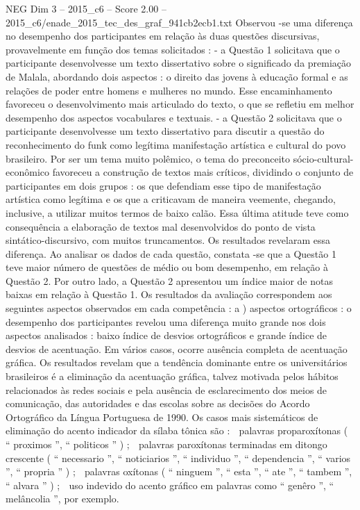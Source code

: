 \begin{textsample}{NEG Dim 3 – 2015\_c6 – Score 2.00 – 2015\_c6/enade\_2015\_tec\_des\_graf\_941cb2ecb1.txt}
Observou -se uma diferença no desempenho dos participantes em relação às duas questões discursivas, provavelmente em função dos temas solicitados : - a Questão 1 solicitava que o participante desenvolvesse um texto dissertativo sobre o significado da premiação de Malala, abordando dois aspectos : o direito das jovens à educação formal e as relações de poder entre homens e mulheres no mundo.
Esse encaminhamento favoreceu o desenvolvimento mais articulado do texto, o que se refletiu em melhor desempenho dos aspectos vocabulares e textuais. - a Questão 2 solicitava que o participante desenvolvesse um texto dissertativo para discutir a questão do reconhecimento do funk como legítima manifestação artística e cultural do povo brasileiro.
Por ser um tema muito polêmico, o tema do preconceito sócio-cultural-econômico favoreceu a construção de textos mais críticos, dividindo o conjunto de participantes em dois grupos : os que defendiam esse tipo de manifestação artística como legítima e os que a criticavam de maneira veemente, chegando, inclusive, a utilizar muitos termos de baixo calão.
Essa última atitude teve como consequência a elaboração de textos mal desenvolvidos do ponto de vista sintático-discursivo, com muitos truncamentos.
Os resultados revelaram essa diferença.
Ao analisar os dados de cada questão, constata -se que a Questão 1 teve maior número de questões de médio ou bom desempenho, em relação à Questão 2.
Por outro lado, a Questão 2 apresentou um índice maior de notas baixas em relação à Questão 1.
Os resultados da avaliação correspondem aos seguintes aspectos observados em cada competência : a ) aspectos ortográficos : o desempenho dos participantes revelou uma diferença muito grande nos dois aspectos analisados : baixo índice de desvios ortográficos e grande índice de desvios de acentuação.
Em vários casos, ocorre ausência completa de acentuação gráfica.
Os resultados revelam que a tendência dominante entre os universitários brasileiros é a eliminação da acentuação gráfica, talvez motivada pelos hábitos relacionados às redes sociais e pela ausência de esclarecimento dos meios de comunicação, das autoridades e das escolas sobre as decisões do Acordo Ortográfico da Língua Portuguesa de 1990.
Os casos mais sistemáticos de eliminação do acento indicador da sílaba tônica são :  palavras proparoxítonas ( “ proximos ”, “ politicos ” ) ;  palavras paroxítonas terminadas em ditongo crescente ( “ necessario ”, “ noticiarios ”, “ individuo ”, “ dependencia ”, “ varios ”, “ propria ” ) ;  palavras oxítonas ( “ ninguem ”, “ esta ”, “ ate ”, “ tambem ”, “ alvara ” ) ;  uso indevido do acento gráfico em palavras como “ genêro ”, “ melâncolia ”, por exemplo.

\end{textsample}
